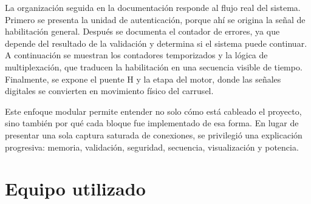 \documentclass[12pt,a4paper]{article}
\begin{document}
La organización seguida en la documentación responde al flujo real del sistema. Primero se presenta la unidad de autenticación, porque ahí se origina la señal de habilitación general. Después se documenta el contador de errores, ya que depende del resultado de la validación y determina si el sistema puede continuar. A continuación se muestran los contadores temporizados y la lógica de multiplexación, que traducen la habilitación en una secuencia visible de tiempo. Finalmente, se expone el puente H y la etapa del motor, donde las señales digitales se convierten en movimiento físico del carrusel.

Este enfoque modular permite entender no solo cómo está cableado el proyecto, sino también por qué cada bloque fue implementado de esa forma. En lugar de presentar una sola captura saturada de conexiones, se privilegió una explicación progresiva: memoria, validación, seguridad, secuencia, visualización y potencia.

\section{Equipo utilizado}
\end{document}
